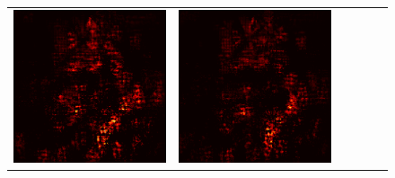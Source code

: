 \documentclass[preprint,12pt]{elsarticle}
\begin{document}
\begin{figure}[p]
\begin{tabular}{cccccc}
  \includegraphics[scale=\scale]{../visualizations/examples/imagenette/cnn/active_saliency_map/8.png} & 
  \includegraphics[scale=\scale]{../visualizations/examples/imagenette/cnn/inactive_saliency_map/8.png} \\
  

\end{tabular}
\end{figure}
\end{document}
